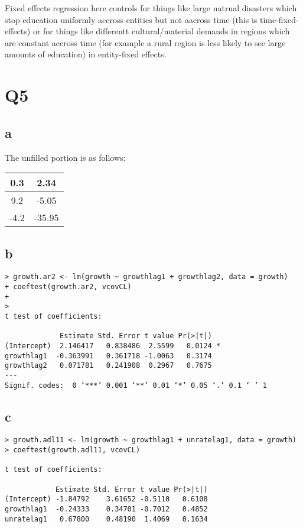 \documentclass[12pt,letterpaper]{article}
\theoremstyle{definition}
\begin{document}
Fixed effects regression here controls for things like large natrual disasters which stop education uniformly accross entities but not aacross time (this is time-fixed-effects) or for things like differentt cultural/material demands in regions which are constant accross time (for example a rural region is less likely to see large amounts of education) in entity-fixed effects.

\section*{Q5}

\subsection*{a}

The unfilled portion is as follows:
\begin{center}
  \begin{tabular}{c|c}
    0.3 & 2.34 \\ \hline
    9.2 & -5.05 \\ \hline
    -4.2 & -35.95
  \end{tabular}
\end{center}

\subsection*{b}

\begin{Verbatim}[fontsize=\small]
> growth.ar2 <- lm(growth ~ growthlag1 + growthlag2, data = growth)
+ coeftest(growth.ar2, vcovCL)
+
>
t test of coefficients:

             Estimate Std. Error t value Pr(>|t|)
(Intercept)  2.146417   0.838486  2.5599   0.0124 *
growthlag1  -0.363991   0.361718 -1.0063   0.3174
growthlag2   0.071781   0.241908  0.2967   0.7675
---
Signif. codes:  0 ‘***’ 0.001 ‘**’ 0.01 ‘*’ 0.05 ‘.’ 0.1 ‘ ’ 1
\end{Verbatim}

\subsection*{c}

\begin{Verbatim}[fontsize=\small]
> growth.adl11 <- lm(growth ~ growthlag1 + unratelag1, data = growth)
> coeftest(growth.adl11, vcovCL)

t test of coefficients:

            Estimate Std. Error t value Pr(>|t|)
(Intercept) -1.84792    3.61652 -0.5110   0.6108
growthlag1  -0.24333    0.34701 -0.7012   0.4852
unratelag1   0.67800    0.48190  1.4069   0.1634
\end{Verbatim}
\end{document}
